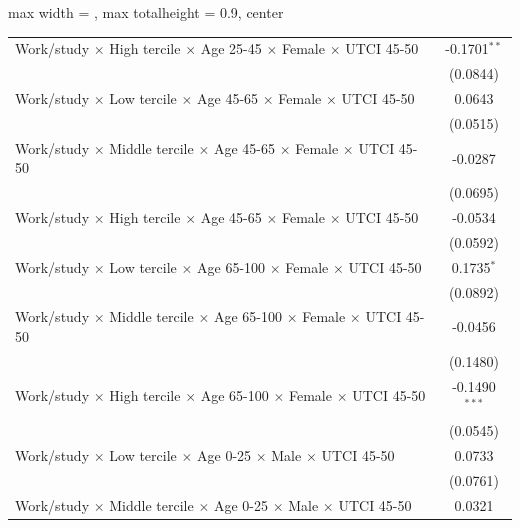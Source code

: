 \begin{table}[htbp]
\begin{adjustbox}{max width = \textwidth, max totalheight = 0.9\textheight, center}
\begin{tabular}{lc}
         Work/study $\times$ High tercile $\times$ Age 25-45 $\times$ Female $\times$ UTCI 45-50        & -0.1701$^{**}$\\   
                                                                                                        & (0.0844)\\   
         Work/study $\times$ Low tercile $\times$ Age 45-65 $\times$ Female $\times$ UTCI 45-50         & 0.0643\\   
                                                                                                        & (0.0515)\\   
         Work/study $\times$ Middle tercile $\times$ Age 45-65 $\times$ Female $\times$ UTCI 45-50      & -0.0287\\   
                                                                                                        & (0.0695)\\   
         Work/study $\times$ High tercile $\times$ Age 45-65 $\times$ Female $\times$ UTCI 45-50        & -0.0534\\   
                                                                                                        & (0.0592)\\   
         Work/study $\times$ Low tercile $\times$ Age 65-100 $\times$ Female $\times$ UTCI 45-50        & 0.1735$^{*}$\\   
                                                                                                        & (0.0892)\\   
         Work/study $\times$ Middle tercile $\times$ Age 65-100 $\times$ Female $\times$ UTCI 45-50     & -0.0456\\   
                                                                                                        & (0.1480)\\   
         Work/study $\times$ High tercile $\times$ Age 65-100 $\times$ Female $\times$ UTCI 45-50       & -0.1490$^{***}$\\   
                                                                                                        & (0.0545)\\   
         Work/study $\times$ Low tercile $\times$ Age 0-25 $\times$ Male $\times$ UTCI 45-50            & 0.0733\\   
                                                                                                        & (0.0761)\\   
         Work/study $\times$ Middle tercile $\times$ Age 0-25 $\times$ Male $\times$ UTCI 45-50         & 0.0321\\   

\end{tabular}
\end{adjustbox}
\end{table}
